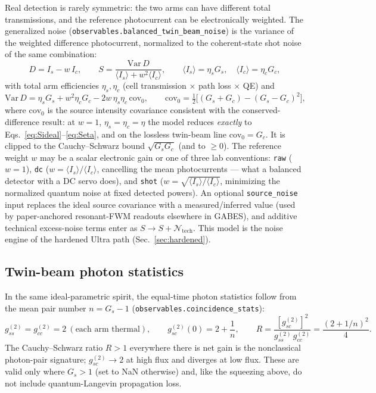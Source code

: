 \documentclass[11pt]{article}
\newcommand{\code}[1]{\texttt{#1}}
\begin{document}
Real detection is rarely symmetric: the two arms can have different total
transmissions, and the reference photocurrent can be electronically weighted.
The generalized noise (\code{observables.balanced\_twin\_beam\_noise}) is the
variance of the weighted difference photocurrent, normalized to the
coherent-state shot noise of the same combination:
\begin{equation}
D=I_s-w\,I_c,
\qquad
S=\frac{\mathrm{Var}\,D}{\langle I_s\rangle+w^2\langle I_c\rangle},
\qquad
\langle I_s\rangle=\eta_s G_s,\quad \langle I_c\rangle=\eta_c G_c,
\label{eq:balancedS}
\end{equation}
with total arm efficiencies $\eta_s,\eta_c$ (cell transmission $\times$ path
loss $\times$ QE) and
\begin{equation}
\mathrm{Var}\,D=\eta_sG_s+w^2\eta_cG_c-2w\,\eta_s\eta_c\,\mathrm{cov}_0,
\qquad
\mathrm{cov}_0=\tfrac12\Big[(G_s+G_c)-(G_s-G_c)^2\Big],
\label{eq:cov0}
\end{equation}
where $\mathrm{cov}_0$ is the source intensity covariance consistent with the
conserved-difference result: at $w=1$, $\eta_s=\eta_c=\eta$ the model reduces
\emph{exactly} to Eqs.~\eqref{eq:Sideal}--\eqref{eq:Seta}, and on the lossless
twin-beam line $\mathrm{cov}_0=G_c$. It is clipped to the Cauchy--Schwarz bound
$\sqrt{G_sG_c}$ (and to $\ge0$). The reference weight $w$ may be a scalar
electronic gain or one of three lab conventions: \code{raw} ($w=1$), \code{dc}
($w=\langle I_s\rangle/\langle I_c\rangle$, cancelling the mean photocurrents
--- what a balanced detector with a DC servo does), and \code{shot}
($w=\sqrt{\langle I_s\rangle/\langle I_c\rangle}$, minimizing the normalized
quantum noise at fixed detected powers). An optional \code{source\_noise} input
replaces the ideal source covariance with a measured/inferred value (used by
paper-anchored resonant-FWM readouts elsewhere in GABES), and additive
technical excess-noise terms enter as $S\to S+\mathcal{N}_{\text{tech}}$. This
model is the noise engine of the hardened Ultra path
(Sec.~\ref{sec:hardened}).

\subsection{Twin-beam photon statistics}

In the same ideal-parametric spirit, the equal-time photon statistics follow from
the mean pair number $n=G_s-1$ (\code{observables.coincidence\_stats}):
\begin{equation}
g^{(2)}_{ss}=g^{(2)}_{cc}=2\ (\text{each arm thermal}),
\qquad
g^{(2)}_{sc}(0)=2+\frac{1}{n},
\qquad
R=\frac{[g^{(2)}_{sc}]^2}{g^{(2)}_{ss}\,g^{(2)}_{cc}}=\frac{(2+1/n)^2}{4}.
\label{eq:g2}
\end{equation}
The Cauchy--Schwarz ratio $R>1$ everywhere there is net gain is the nonclassical
photon-pair signature; $g^{(2)}_{sc}\to2$ at high flux and diverges at low flux.
These are valid only where $G_s>1$ (set to NaN otherwise) and, like the squeezing
above, do not include quantum-Langevin propagation loss.
\end{document}
